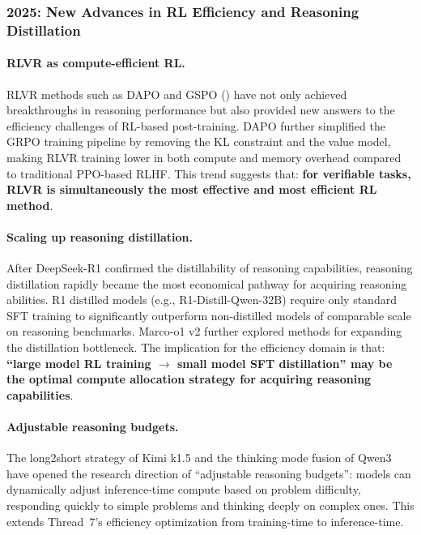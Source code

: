 \subsubsection{2025: New Advances in RL Efficiency and Reasoning Distillation}
\label{sec:t7-rl-distill-2025}

\paragraph{RLVR as compute-efficient RL.}
RLVR methods such as DAPO \cite{yu2025dapo} and GSPO \cite{zheng2025gspo}
() have not only achieved breakthroughs in reasoning performance
but also provided new answers to the efficiency challenges of RL-based post-training.
DAPO further simplified the GRPO training pipeline by removing the KL constraint and the value model,
making RLVR training lower in both compute and memory overhead compared to traditional PPO-based RLHF.
This trend suggests that: \textbf{for verifiable tasks, RLVR is simultaneously the most effective and most efficient RL method}.

\paragraph{Scaling up reasoning distillation.}
After DeepSeek-R1 \cite{deepseek2025r1} confirmed the distillability of reasoning capabilities,
reasoning distillation rapidly became the most economical pathway for acquiring reasoning abilities.
R1 distilled models (e.g., R1-Distill-Qwen-32B) require only standard SFT training
to significantly outperform non-distilled models of comparable scale on reasoning benchmarks.
Marco-o1 v2 \cite{yin2025marcoo1v2} further explored methods for expanding the distillation bottleneck.
The implication for the efficiency domain is that:
\textbf{``large model RL training $\to$ small model SFT distillation'' may be the optimal compute allocation strategy for acquiring reasoning capabilities}.

\paragraph{Adjustable reasoning budgets.}
The long2short strategy of Kimi k1.5 \cite{moonshot2025kimi} and
the thinking mode fusion of Qwen3 \cite{yang2025qwen3}
have opened the research direction of ``adjustable reasoning budgets'':
models can dynamically adjust inference-time compute based on problem difficulty,
responding quickly to simple problems and thinking deeply on complex ones.
This extends Thread~7's efficiency optimization from training-time to inference-time.


